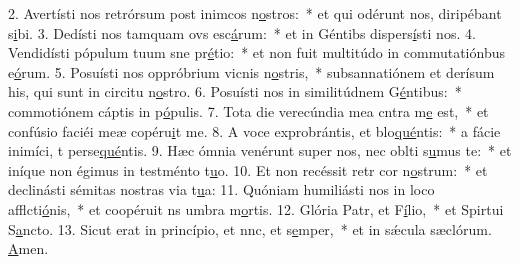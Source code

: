 2. Avertísti nos retrórsum post inimcos n\uline{o}stros:~* et qui odérunt nos, diripébant s\uline{i}bi.
3. Dedísti nos tamquam ovs esc\uline{á}rum:~* et in Géntibs dispers\uline{í}sti nos.
4. Vendidísti pópulum tuum sne pr\uline{é}tio:~* et non fuit multitúdo in commutatiónbus e\uline{ó}rum.
5. Posuísti nos oppróbrium vicnis n\uline{o}stris,~* subsannatiónem et derísum his, qui sunt in circitu n\uline{o}stro.
6. Posuísti nos in similitúdnem G\uline{é}ntibus:~* commotiónem cáptis in p\uline{ó}pulis.
7. Tota die verecúndia mea cntra m\uline{e} est,~* et confúsio faciéi meæ copéru\uline{i}t me.
8. A voce exprobrántis, et blo\uline{qué}ntis:~* a fácie inimíci, t perse\uline{qué}ntis.
9. Hæc ómnia venérunt super nos, nec oblti s\uline{u}mus te:~* et iníque non égimus in testménto t\uline{u}o.
10. Et non recéssit retr cor n\uline{o}strum:~* et declinásti sémitas nostras  via t\uline{u}a:
11. Quóniam humiliásti nos in loco afflcti\uline{ó}nis,~* et coopéruit ns umbra m\uline{o}rtis.
12. Glória Patr, et F\uline{í}lio,~* et Spirtui S\uline{a}ncto.
13. Sicut erat in princípio, et nnc, et s\uline{e}mper,~* et in sǽcula sæclórum. \uline{A}men.
